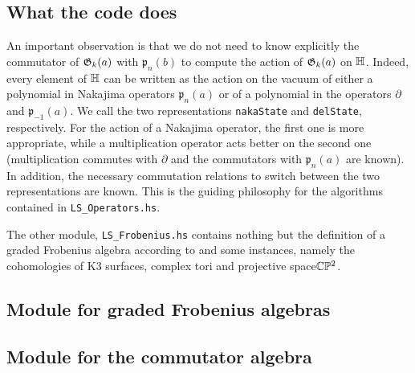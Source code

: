 \subsection{What the code does}
An important observation is that we do not need to know explicitly the commutator of $\mathfrak{G}_k(a)$ with $\mathfrak p_n(b)$ to compute the action of $\mathfrak{G}_k(a)$ on $\mathbb{H}$. 
Indeed, every element of $\mathbb{H}$ can be written as the action on the vacuum of either a polynomial in Nakajima operators $\mathfrak p_n(a)$ or of a polynomial in the operators $\partial$ and $\mathfrak p_{-1}(a)$. We call the two representations \verb|nakaState| and \verb|delState|, respectively. For the action of a Nakajima operator, the first one is more appropriate, while a multiplication operator acts better on the second one (multiplication commutes with $\partial$ and the commutators with $\mathfrak p_n(a)$ are known). 
In addition, the necessary commutation relations to switch between the two representations are known. This is the guiding philosophy for the algorithms contained in \verb|LS_Operators.hs|.

The other module, \verb|LS_Frobenius.hs| contains nothing but the definition of a graded Frobenius algebra according to \cite[Section 2.1]{LehnSorger} and some instances, namely the cohomologies of K3 surfaces, complex tori and projective space$\mathbb{C}\mathbb P^2$.

\subsection{Module for graded Frobenius algebras} 

\subsection{Module for the commutator algebra} 

